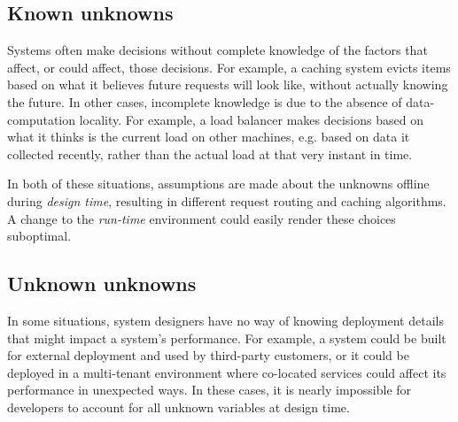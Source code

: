 \documentclass[a4paper,twocolumn]{article}
\newcommand{\ignore}[1]{}
\begin{document}
\subsection*{Known unknowns}

Systems often make decisions without complete knowledge of the factors that
affect, or could affect, those decisions.  For example, a caching system evicts
items based on what it believes future requests will look like, without actually
knowing the future.  In other cases, incomplete knowledge is due to the absence
of data-computation locality.  For example, a load balancer makes decisions
based on what it thinks is the current load on other machines, e.g. based on
data it collected recently, rather than the actual load at that very instant in
time.

In both of these situations, assumptions are made about the unknowns offline
during \emph{design time}, resulting in different request routing and caching
algorithms. A change to the \emph{run-time} environment could easily render
these choices suboptimal.

\ignore{
Online learning has the potential to make these decisions online, based on current contexts,
and can be nimble in adapting to any changes to the run-time
environment.
}

\subsection*{Unknown unknowns}

In some situations, system designers have no way of knowing deployment details
that might impact a system's performance. For example, a system could be built
for external deployment and used by third-party customers, or it could be
deployed in a multi-tenant environment where co-located services could affect
its performance in unexpected ways. In these cases, it is nearly impossible for
developers to account for all unknown variables at design time.

\ignore{
However, an ML agent is able to make
decisions online based on inputs from the run-time environment.
}
\ignore{
To be clear, ML has been used in some distributed systems. However, it has not
been used in a general way to make online decisions about core distributed
systems implementation details. We advocate that developers should focus on
high-level objectives of their system, and use online ML to make to compute the
specifics (such as policies for request routing, replica placement, or failure
monitoring) at run-time based on observed metrics.
}
\end{document}
